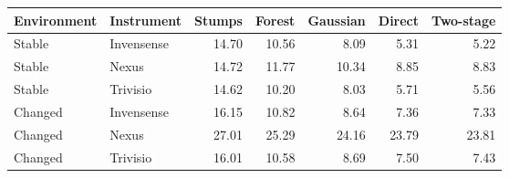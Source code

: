 \begin{tabular}{llrrrrr}
\toprule
Environment & Instrument & Stumps & Forest & Gaussian & Direct & Two-stage\\
\midrule
Stable & Invensense & 14.70 & 10.56 & 8.09 & 5.31 & 5.22\\
Stable & Nexus & 14.72 & 11.77 & 10.34 & 8.85 & 8.83\\
Stable & Trivisio & 14.62 & 10.20 & 8.03 & 5.71 & 5.56\\
Changed & Invensense & 16.15 & 10.82 & 8.64 & 7.36 & 7.33\\
Changed & Nexus & 27.01 & 25.29 & 24.16 & 23.79 & 23.81\\
Changed & Trivisio & 16.01 & 10.58 & 8.69 & 7.50 & 7.43\\
\bottomrule
\end{tabular}
